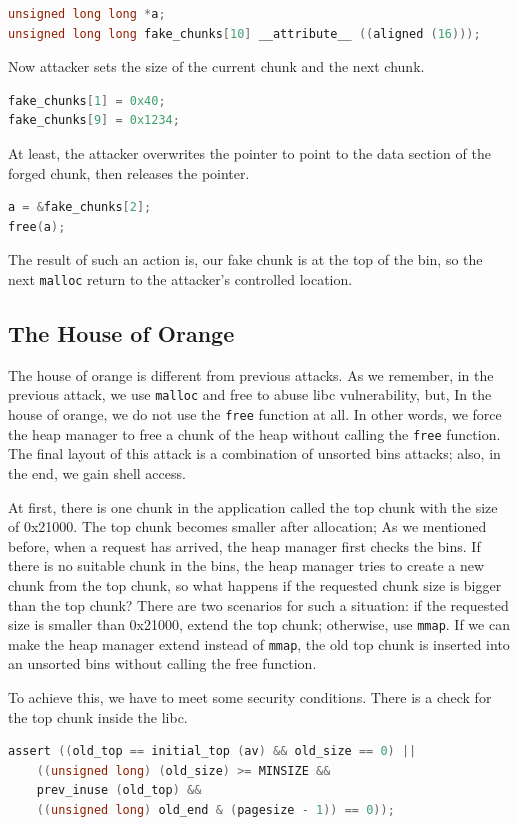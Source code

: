 \documentclass{masterthesis}
\newcommand*\ub{unsorted bins}
\newcommand*\mallocc{\lstinline{malloc}}
\newcommand*\freec{\lstinline{free}}
\newcommand*\mmapc{\lstinline{mmap}}
\begin{document}
\begin{lstlisting}[language=c,frame=tlrb]
unsigned long long *a;
unsigned long long fake_chunks[10] __attribute__ ((aligned (16)));
\end{lstlisting}

Now attacker sets the size of the current chunk and the next chunk.

\begin{lstlisting}[language=c,frame=tlrb]
fake_chunks[1] = 0x40;
fake_chunks[9] = 0x1234;
\end{lstlisting}

At least, the attacker overwrites the pointer to point to the data section of the forged chunk, then releases the pointer.

\begin{lstlisting}[language=c,frame=tlrb]
a = &fake_chunks[2];
free(a);
\end{lstlisting}

The result of such an action is, our fake chunk is at the top of the bin, so the next \mallocc{} return to the attacker's controlled location.

\subsection{The House of Orange}
The house of orange is different from previous attacks. As we remember, in the previous attack, we use \mallocc{} and free to abuse libc vulnerability, but, In the house of orange, we do not use the \freec{} function at all. In other words, we force the heap manager to free a chunk of the heap without calling the \freec{} function. The final layout of this attack is a combination of \ub{} attacks; also, in the end, we gain shell access.

At first, there is one chunk in the application called the top chunk with the size of 0x21000. The top chunk becomes smaller after allocation; As we mentioned before, when a request has arrived, the heap manager first checks the bins. If there is no suitable chunk in the bins, the heap manager tries to create a new chunk from the top chunk, so what happens if the requested chunk size is bigger than the top chunk? There are two scenarios for such a situation: if the requested size is smaller than 0x21000, extend the top chunk; otherwise, use \mmapc{}. If we can make the heap manager extend instead of \mmapc{}, the old top chunk is inserted into an \ub{} without calling the free function.

To achieve this, we have to meet some security conditions. There is a check for the top chunk inside the libc.
\begin{lstlisting}[language=c,frame=tlrb]
 assert ((old_top == initial_top (av) && old_size == 0) ||
	((unsigned long) (old_size) >= MINSIZE &&
	prev_inuse (old_top) &&
	((unsigned long) old_end & (pagesize - 1)) == 0));
\end{lstlisting}
\end{document}
